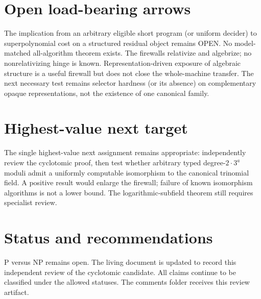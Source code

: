 \documentclass[11pt]{article}
\begin{document}
\section{Open load-bearing arrows}
The implication from an arbitrary eligible short program (or uniform decider) to superpolynomial cost on a structured residual object remains OPEN. No model-matched all-algorithm theorem exists. The firewalls relativize and algebrize; no nonrelativizing hinge is known. Representation-driven exposure of algebraic structure is a useful firewall but does not close the whole-machine transfer. The next necessary test remains selector hardness (or its absence) on complementary opaque representations, not the existence of one canonical family.

\section{Highest-value next target}
The single highest-value next assignment remains appropriate: independently review the cyclotomic proof, then test whether arbitrary typed degree-$2\cdot3^a$ moduli admit a uniformly computable isomorphism to the canonical trinomial field. A positive result would enlarge the firewall; failure of known isomorphism algorithms is not a lower bound. The logarithmic-subfield theorem still requires specialist review.

\section{Status and recommendations}
P versus NP remains open. The living document is updated to record this independent review of the cyclotomic candidate. All claims continue to be classified under the allowed statuses. The comments folder receives this review artifact.

\end{document}
